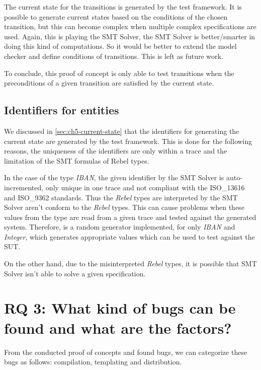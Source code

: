The current state for the transitions is generated by the test framework. It is possible to generate current states based on the conditions of the chosen transition, but this can become complex when multiple complex specifications are used. Again, this is playing the SMT Solver, the SMT Solver is better/smarter in doing this kind of computations. So it would be better to extend the model checker and define conditions of transitions. This is left as future work.

To conclude, this proof of concept is only able to test transitions when the preconditions of a given transition are satisfied by the current state.


\subsection{Identifiers for entities}
We discussed in \autoref{sec:ch5-current-state} that the identifiers for generating the current state are generated by the test framework. This is done for the following reasons, the uniqueness of the identifiers are only within a trace and the limitation of the SMT formulas of Rebel types.

In the case of the type \textit{IBAN}, the given identifier by the SMT Solver is auto-incremented, only unique in one trace and not compliant with the ISO\_13616 and ISO\_9362 standards. Thus the \textit{Rebel} types are interpreted by the SMT Solver aren't conform to the \textit{Rebel} types. This can cause problems when these values from the type are read from a given trace and tested against the generated system. Therefore, is a random generator implemented, for only \textit{IBAN} and \textit{Integer}, which generates appropriate values which can be used to test against the SUT.

On the other hand, due to the misinterpreted \textit{Rebel} types, it is possible that SMT Solver isn't able to solve a given specification.


\section{RQ 3: What kind of bugs can be found and what are the factors?}

From the conducted proof of concepts and found bugs, we can categorize these bugs as follows: compilation, templating and distribution.

